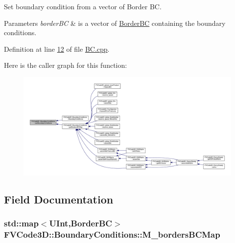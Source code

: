 Set boundary condition from a vector of Border BC. 


\begin{DoxyParams}{Parameters}
{\em border\+BC} & is a vector of \hyperlink{classFVCode3D_1_1BoundaryConditions_1_1BorderBC}{Border\+BC} containing the boundary conditions. \\
\hline
\end{DoxyParams}


Definition at line \hyperlink{BC_8cpp_source_l00012}{12} of file \hyperlink{BC_8cpp_source}{B\+C.\+cpp}.



Here is the caller graph for this function\+:
\nopagebreak
\begin{figure}[H]
\begin{center}
\leavevmode
\includegraphics[width=350pt]{classFVCode3D_1_1BoundaryConditions_ae368974020ff21456d0fef9ef9d8006d_icgraph}
\end{center}
\end{figure}




\subsection{Field Documentation}
\subsubsection[{\texorpdfstring{M\+\_\+borders\+B\+C\+Map}{M_bordersBCMap}}]{\setlength{\rightskip}{0pt plus 5cm}std\+::map$<${\bf U\+Int},{\bf Border\+BC}$>$ F\+V\+Code3\+D\+::\+Boundary\+Conditions\+::\+M\+\_\+borders\+B\+C\+Map\hspace{0.3cm}{\ttfamily [protected]}}\hypertarget{classFVCode3D_1_1BoundaryConditions_a22895d7e9ca19c8eb4a5ee34d2ad8b17}{}\label{classFVCode3D_1_1BoundaryConditions_a22895d7e9ca19c8eb4a5ee34d2ad8b17}


